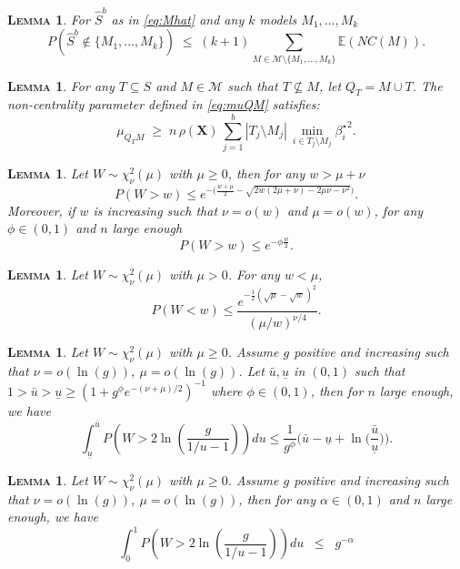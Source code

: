 \documentclass[aos]{imsart}
\theoremstyle{plain}
\newtheorem{lem}[thm]{\textsc{Lemma}}
\newcommand{\E}{\mathbb{E}}
\newcommand{\M}{\mathcal{M}}
\newcommand{\bs}{\boldsymbol}
\begin{document}
\begin{lem}\label{lem:L0toL1convergencegen} For $\hat S^b$ as in \eqref{eq:Mhat} and any $k$ models $M_1,\ldots,M_k$
$$P(\hat{S}^b\not\in \{M_1,\ldots,M_k\})\;\leq\; (k+1) \sum_{M \in \M\setminus \{M_1,\ldots,M_k\}}\E\left( NC(M)\right).$$
\end{lem}

\begin{lem}\label{lem:boundrhogen}
 For any $T\subseteq S$ and $M\in\M$ such that $T\not\subseteq M$, let $Q_T=M \cup T$. The non-centrality parameter defined in \eqref{eq:muQM} satisfies: 
\begin{equation}
    \mu_{Q_TM}\; \geq \;n\,\rho(\bs X)\,\sum_{j=1}^b|T_j\setminus M_j|\,\min_{i\in T_j\setminus M_j}{\beta_{i}^{\star}}^2.
\end{equation}
\end{lem}

\begin{lem}\label{lemma:s1s3}
Let $W\sim\chi_{\nu}^2(\mu)$ with $\mu \geq 0$, then for any $w>\mu+\nu$
$$P(W > w) \leq e^{-\big(\frac{w+\mu}{2}  - \sqrt{2w( 2 \mu+ \nu)-2 \mu \nu - \nu^2 } \big)}. $$
Moreover, if $w$ is increasing such that $\nu=o(w)$ and $\mu=o(w)$, for any $\phi\in(0,1)$ and $n$ large enough
$$P(W > w)  \leq  e^{-\phi\frac{w}{2}}.$$
\end{lem}

\begin{lem}\label{lemma:s2} Let $W \sim \chi_\nu^2(\mu)$ with $\mu>0$. For any $w<\mu$, 
$$
P(W<w) \leq \frac{e^{-\frac{1}{2}(\sqrt{\mu}-\sqrt{w})^2}}{(\mu / w)^{\nu / 4}}.$$
\end{lem}

\begin{lem}\label{lemma:s18} 
    Let $W\sim \chi_\nu^2(\mu)$ with $\mu \geq 0$. Assume $g$ positive and increasing such that $\nu=o(\ln(g))$, $\mu=o(\ln(g))$. Let $\bar{u},\underline{u}$ in $(0,1)$ such that $1>\bar{u}>\underline{u}\geq\left(1+g^{\phi}e^{-(\nu+\mu)/2}\right)^{-1}$ where $\phi\in(0,1)$, then for $n$ large enough, we have
$$
\int_{\underline{u}}^{\bar{u}} P\left(W>2\ln \left(\frac{g}{1 / u-1}\right)\right) d u \leq  \frac{1}{g^{\phi}}\Big(\bar{u}-\underline{u}+\ln\Big(\frac{\bar{u}}{\underline{u}}\Big)\Big).
$$

\end{lem}

\begin{lem}\label{lemma:s20}
 Let $W\sim \chi_\nu^2(\mu)$ with $\mu \geq 0$. Assume $g$ positive and increasing such that $\nu=o(\ln(g))$, $\mu=o(\ln(g))$, then for any $\alpha\in(0,1)$ and $n$ large enough, we have
$$
\int_0^1 P\left(W>2 \ln \left(\frac{g}{1 / u-1}\right)\right) d u\;\; \leq\;\;  g^{-\alpha}$$
\end{lem}
\end{document}
